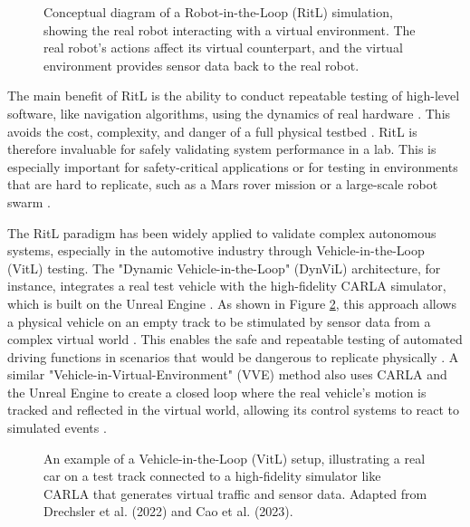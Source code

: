 \begin{figure}[h]
\centering
\caption{Conceptual diagram of a Robot-in-the-Loop (RitL) simulation, showing the real robot interacting with a virtual environment. The real robot's actions affect its virtual counterpart, and the virtual environment provides sensor data back to the real robot.}
\label{fig:ritl_concept}
\end{figure}

The main benefit of RitL is the ability to conduct repeatable testing of high-level software, like navigation algorithms, using the dynamics of real hardware \cite{Mihalic2022}. This avoids the cost, complexity, and danger of a full physical testbed \cite{Mihalic2022}. RitL is therefore invaluable for safely validating system performance in a lab. This is especially important for safety-critical applications or for testing in environments that are hard to replicate, such as a Mars rover mission or a large-scale robot swarm \cite{Hu2005, Mihalic2022}.



The RitL paradigm has been widely applied to validate complex autonomous systems, especially in the automotive industry through Vehicle-in-the-Loop (VitL) testing. The "Dynamic Vehicle-in-the-Loop" (DynViL) architecture, for instance, integrates a real test vehicle with the high-fidelity CARLA simulator, which is built on the Unreal Engine \cite{Drechsler2022}. As shown in Figure \ref{fig:vitl_setup}, this approach allows a physical vehicle on an empty track to be stimulated by sensor data from a complex virtual world \cite{Drechsler2022}. This enables the safe and repeatable testing of automated driving functions in scenarios that would be dangerous to replicate physically \cite{Drechsler2022}. A similar "Vehicle-in-Virtual-Environment" (VVE) method also uses CARLA and the Unreal Engine to create a closed loop where the real vehicle's motion is tracked and reflected in the virtual world, allowing its control systems to react to simulated events \cite{Cao2023}.

\begin{figure}[h]
\centering
\caption{An example of a Vehicle-in-the-Loop (VitL) setup, illustrating a real car on a test track connected to a high-fidelity simulator like CARLA that generates virtual traffic and sensor data. Adapted from Drechsler et al. (2022) and Cao et al. (2023).}
\label{fig:vitl_setup}
\end{figure}


